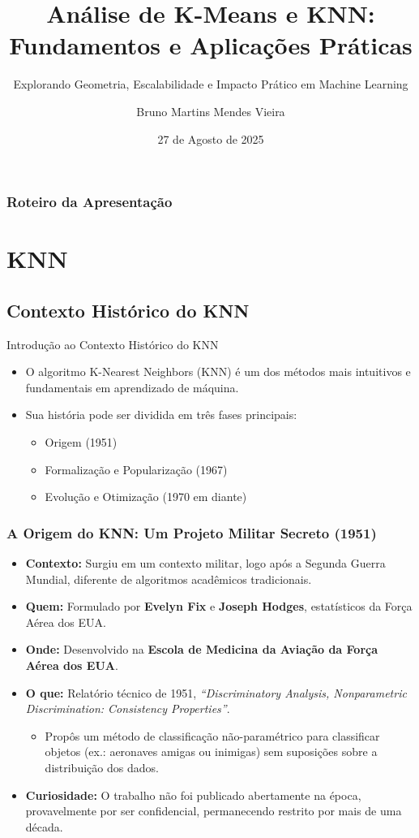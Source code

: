 \documentclass{beamer}
\title[Análise de Algoritmos de ML]{Análise  de K-Means e KNN: Fundamentos e Aplicações Práticas}
\subtitle{Explorando Geometria, Escalabilidade e Impacto Prático em Machine Learning}
\author[Bruno M.M. Vieira]{Bruno Martins Mendes Vieira}
\institute[PPGFA]{Programa de Pós-Graduação em Física Ambiental}
\date{27 de Agosto de 2025}
\begin{document}
\begin{frame}
  \titlepage
\end{frame}

\begin{frame}
  \frametitle{Roteiro da Apresentação}
  \tableofcontents
\end{frame}
\section{KNN}
\subsection{Contexto Histórico do KNN}
\begin{frame}{Introdução ao Contexto Histórico do KNN}
\begin{itemize}
\item<1-> O algoritmo K-Nearest Neighbors (KNN) é um dos métodos mais intuitivos e fundamentais em aprendizado de máquina.
\item<2-> Sua história pode ser dividida em três fases principais:
\begin{itemize}
\item Origem (1951)
\item Formalização e Popularização (1967)
\item Evolução e Otimização (1970 em diante)
\end{itemize}
\end{itemize}
\end{frame}

\begin{frame}
\frametitle{A Origem do KNN: Um Projeto Militar Secreto (1951)}
\begin{itemize}
\item<1-> \textbf{Contexto:} Surgiu em um contexto militar, logo após a Segunda Guerra Mundial\@, diferente de algoritmos acadêmicos tradicionais.
\pause
\item \textbf{Quem:} Formulado por \textbf{Evelyn Fix} e \textbf{Joseph Hodges}, estatísticos da Força Aérea dos EUA.
\item \textbf{Onde:} Desenvolvido na \textbf{Escola de Medicina da Aviação da Força Aérea dos EUA}.
\item \textbf{O que:} Relatório técnico de 1951, \textit{``Discriminatory Analysis, Nonparametric Discrimination: Consistency Properties''}.
\begin{itemize}
\item Propôs um método de classificação não-paramétrico para classificar objetos (ex.: aeronaves amigas ou inimigas) sem suposições sobre a distribuição dos dados.
\end{itemize}
\pause
\item \textbf{Curiosidade:} O trabalho não foi publicado abertamente na época, provavelmente por ser confidencial, permanecendo restrito por mais de uma década.
\end{itemize}
\end{frame}
\end{document}
